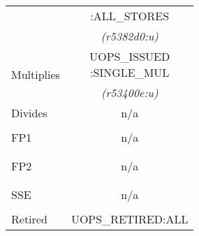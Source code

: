 \begin{tabular}{|l||c|}
                          &
:ALL\_STORES              \\ %


                          &
{\em (r5382d0:u)}         \\ %


\hline
\multirow{3}{*}{\parbox{0.5in}{Multiplies}}                 &  
\multirow{2}{*}{\parbox{1in}{\centering UOPS\_ISSUED\\
:SINGLE\_MUL}}             \\ %


			&
			\\ %


                      &
{\em (r53400e:u)}     \\ %



\hline
Divides &
n/a		\\ %


\hline
\multirow{3}{*}{\parbox{0.5in}{FP1}}  &
              \\ %

			&
n/a          \\  %



                      &
     \\ %


\hline
\multirow{3}{*}{\parbox{0.5in}{FP2}}     &  
                              \\ %

               &  
n/a \\ %



                      &
\\ %


\hline
\multirow{3}{*}{\parbox{0.5in}{SSE}}   & 
				\\ %


               &  
n/a		\\  %

                      &
     \\ %



\hline
Retired               &  
UOPS\_RETIRED:ALL     \\ %



\end{tabular}

